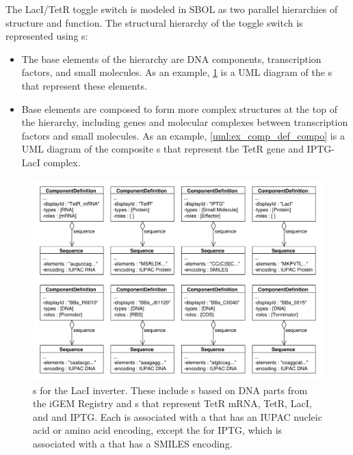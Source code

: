 The LacI/TetR toggle switch is modeled in SBOL as two parallel hierarchies of structure and function. The structural hierarchy of the toggle switch is represented using s:
\begin{itemize}
\item The base elements of the hierarchy are DNA components, transcription factors, and small molecules. As an example, \ref{uml:ex_comp_defs} is a UML diagram of the s that represent these elements.
\item Base elements are composed to form more complex structures at the top of the hierarchy, including genes and molecular complexes between transcription factors and small molecules. As an example, \ref{uml:ex_comp_def_compo} is a UML diagram of the composite s that represent the TetR gene and IPTG-LacI complex.
\end{itemize}

\begin{figure}[ht]
\begin{center}
\includegraphics[width=\textwidth]{example_uml/toggle_1}
\caption[]{s for the LacI inverter. These include s based on DNA parts from the iGEM Registry and  s that represent TetR mRNA, TetR, LacI, and and IPTG. Each  is associated with a  that has an IUPAC nucleic acid or amino acid encoding, except the  for IPTG, which is associated with a  that has a SMILES encoding.}
\label{uml:ex_comp_defs}
\end{center}
\end{figure}

